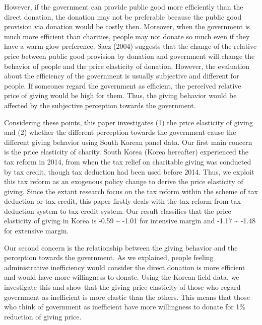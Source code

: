 \documentclass[ review  , 3p ]{elsarticle}
\begin{document}
  However, if the government can provide public good more efficiently than the direct donation, the donation may not be preferable because the public good provision via donation would be costly then.
  Moreover, when the government is much more efficient than charities, people may not donate so much even if they have a warm-glow preference. Saez (2004) suggests that the change of the relative price between public good provision by donation and government will change the behavior of people and the price elasticity of donation.
  However, the evaluation about the efficiency of the government is usually subjective and different for people. If someones regard the government as efficient, the perceived relative price of giving would be high for them. Thus, the giving behavior would be affected by the subjective perception towards the government.

  Considering these points, this paper investigates (1) the price elasticity of giving and (2) whether the different perception towards the government cause the different giving behavior using South Korean panel data.
  Our first main concern is the price elasticity of charity. South Korea (Korea hereafter) experienced the tax reform in 2014, from when the tax relief on charitable giving was conducted by tax credit, though tax deduction had been used before 2014. Thus, we exploit this tax reform as an exogenous policy change to derive the price elasticity of giving. Since the extant research focus on the tax reform within the scheme of tax deduction or tax credit, this paper firstly deals with the tax reform from tax deduction system to tax credit system.
  Our result classifies that the price elasticity of giving in Korea is -0.59 \textasciitilde{} -1.01 for intensive margin and -1.17 \textasciitilde{} -1.48 for extensive margin.

  Our second concern is the relationship between the giving behavior and the perception towards the government. As we explained, people feeling administrative inefficiency would consider the direct donation is more efficient and would have more willingness to donate. Using the Korean field data, we investigate this and show that the giving price elasticity of those who regard government as inefficient is more elastic than the others. This means that those who think of government as inefficient have more willingness to donate for 1\% reduction of giving price.
\end{document}
